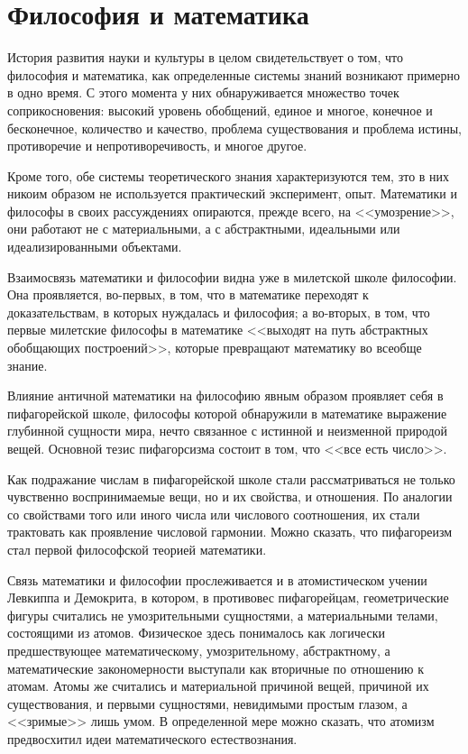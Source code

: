 \documentclass[a4page]{article}
\begin{document}
\section{Философия и математика}
История развития науки и культуры в целом свидетельствует о том,
что философия и математика,
как определенные системы знаний возникают примерно в одно время.
С этого момента у них обнаруживается множество точек соприкосновения:
высокий уровень обобщений, единое и многое, конечное и бесконечное,
количество и качество, проблема существования и проблема истины,
противоречие и непротиворечивость, и многое другое.

Кроме того, обе системы теоретического знания характеризуются тем,
зто в них никоим образом не используется практический эксперимент, опыт.
Математики и философы в своих рассуждениях опираются, прежде всего, на <<умозрение>>,
они работают не с материальными, а с абстрактными,
идеальными или идеализированными объектами.

Взаимосвязь математики и философии видна уже в милетской школе философии.
Она проявляется, во-первых, в том, что в математике переходят к доказательствам,
в которых нуждалась и философия;
а во-вторых, в том, что первые милетские философы в математике
<<выходят на путь абстрактных обобщающих построений>>, %
которые превращают математику во всеобще знание.

Влияние античной математики на философию явным образом проявляет себя в пифагорейской школе,
философы которой обнаружили в математике выражение глубинной сущности мира,
нечто связанное с истинной и неизменной природой вещей.
Основной тезис пифагорсизма состоит в том, что <<все есть число>>.

Как подражание числам в пифагорейской школе стали рассматриваться
не только чувственно воспринимаемые вещи, но и их свойства, и отношения.
По аналогии со свойствами того или иного числа или числового соотношения,
их стали трактовать как проявление числовой гармонии.
Можно сказать, что пифагореизм стал первой философской теорией математики.

Связь математики и философии прослеживается и в атомистическом
учении Левкиппа и Демокрита, в котором, в противовес пифагорейцам,
геометрические фигуры считались не умозрительными сущностями,
а материальными телами, состоящими из атомов.
Физическое здесь понималось как логически предшествующее математическому,
умозрительному, абстрактному,
а математические закономерности выступали как вторичные по отношению к атомам.
Атомы же считались и материальной причиной вещей, причиной их существования,
и первыми сущностями, невидимыми простым глазом, а <<зримые>> лишь умом.
В определенной мере можно сказать, что атомизм предвосхитил идеи математического естествознания.
\end{document}
